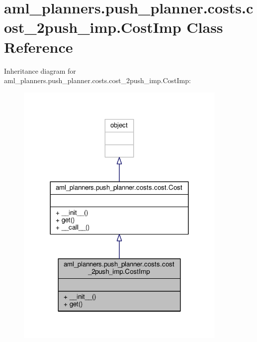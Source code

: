 \hypertarget{classaml__planners_1_1push__planner_1_1costs_1_1cost__2push__imp_1_1_cost_imp}{\section{aml\-\_\-planners.\-push\-\_\-planner.\-costs.\-cost\-\_\-2push\-\_\-imp.\-Cost\-Imp Class Reference}
\label{classaml__planners_1_1push__planner_1_1costs_1_1cost__2push__imp_1_1_cost_imp}
}


Inheritance diagram for aml\-\_\-planners.\-push\-\_\-planner.\-costs.\-cost\-\_\-2push\-\_\-imp.\-Cost\-Imp\-:
\nopagebreak
\begin{figure}[H]
\begin{center}
\leavevmode
\includegraphics[width=288pt]{classaml__planners_1_1push__planner_1_1costs_1_1cost__2push__imp_1_1_cost_imp__inherit__graph}
\end{center}
\end{figure}


